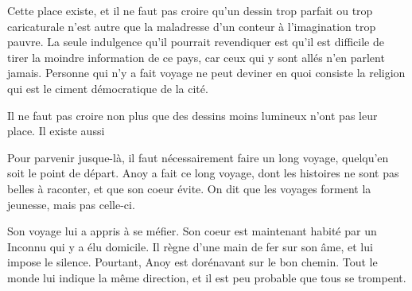 Cette place existe, et il ne faut pas croire qu'un dessin trop parfait
ou trop caricaturale n'est autre que la maladresse d'un conteur à
l'imagination trop pauvre. La seule indulgence qu'il pourrait
revendiquer est qu'il est difficile de tirer la moindre information de
ce pays, car ceux qui y sont allés n'en parlent jamais.  Personne qui
n'y a fait voyage ne peut deviner en quoi consiste la religion qui est
le ciment démocratique de la cité.

Il ne faut pas croire non plus que des dessins moins lumineux n'ont
pas leur place. Il existe aussi

Pour parvenir jusque-là, il faut nécessairement faire un long voyage,
quelqu'en soit le point de départ. Anoy a fait ce long voyage, dont
les histoires ne sont pas belles à raconter, et que son coeur
évite. On dit que les voyages forment la jeunesse, mais pas celle-ci.

Son voyage lui a appris à se méfier. Son coeur est maintenant habité
par un Inconnu qui y a élu domicile. Il règne d'une main de fer sur
son âme, et lui impose le silence. Pourtant, Anoy est dorénavant sur le
bon chemin. Tout le monde lui indique la même direction, et il est peu
probable que tous se trompent.


